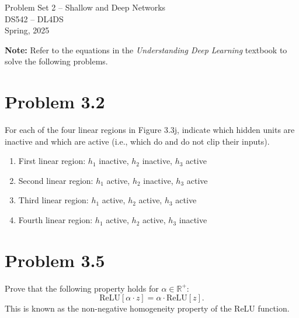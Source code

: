 \documentclass[10pt]{article}
\begin{document}
\begin{center}
    \LARGE {Problem Set 2 – Shallow and Deep Networks} \\[1em]
    \Large{DS542 – DL4DS} \\[0.5em]
    \large Spring, 2025
\end{center}

\vspace{2em}

\noindent\textbf{Note:} Refer to the equations in the \textit{Understanding Deep Learning} textbook to solve the following problems.

\vspace{2em}

\section*{Problem 3.2}
For each of the four linear regions in Figure 3.3j, indicate which hidden units are inactive and which are active (i.e., which do and do not clip their inputs).
\begin{enumerate}
    \item First linear region: $h_1$ inactive, $h_2$ inactive, $h_3$ active
    \item Second linear region: $h_1$ active, $h_2$ inactive, $h_3$ active
    \item Third linear region: $h_1$ active, $h_2$ active, $h_3$ active
    \item Fourth linear region: $h_1$ active, $h_2$ active, $h_3$ inactive
\end{enumerate}
\vspace{2em}

\section*{Problem 3.5}

Prove that the following property holds for $\alpha \in \mathbb{R}^+$:
\[
\text{ReLU}[\alpha \cdot z] = \alpha \cdot \text{ReLU}[z].
\]
This is known as the non-negative homogeneity property of the ReLU function.
\end{document}
